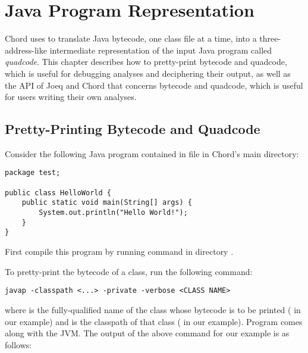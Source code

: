 \chapter{Java Program Representation}
\label{chap:program-representation}

Chord uses  to translate
Java bytecode, one class file at a time, into a three-address-like
intermediate representation of the input Java program called {\it
quadcode}.  This chapter describes how to pretty-print bytecode and
quadcode, which is useful for debugging analyses and deciphering their
output, as well as the API of Joeq and Chord that concerns bytecode
and quadcode, which is useful for users writing their own analyses.

\section{Pretty-Printing Bytecode and Quadcode}

Consider the following Java program contained in
file  in Chord's
main directory:
\begin{framed}
\begin{verbatim}
package test;

public class HelloWorld {
    public static void main(String[] args) {
        System.out.println("Hello World!");
    }
}
\end{verbatim}
\end{framed}

First compile this program by running command  in
directory .

To pretty-print the bytecode of a class, run the following command:
\begin{framed}
\begin{verbatim}
javap -classpath <...> -private -verbose <CLASS NAME>
\end{verbatim}
\end{framed}

where {\tt <CLASS NAME>} is the fully-qualified name of the class
whose bytecode is to be printed ( in our
example) and  is the classpath of that class
( in our example).  Program 
comes along with the JVM.  The output of the above command for our
example is as follows:

